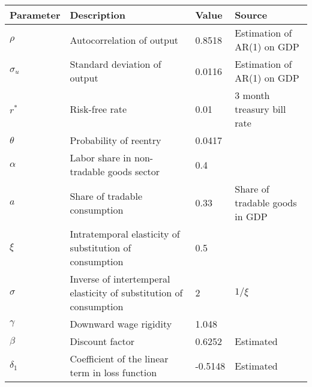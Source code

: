 \begin{table}[h]
    \centering
    \begin{tabular}{@{}llll@{}}
        \toprule
    Parameter  & Description                                                       & Value  & Source                                                                         \\ \midrule
    $\rho$     & Autocorrelation of output                                         & 0.8518 & Estimation of AR(1) on GDP\\
    $\sigma_u$ & Standard deviation of output                                      & 0.0116 & Estimation of AR(1) on GDP\\
    $r^*$      & Risk-free rate                                                    & 0.01 & 3 month treasury bill rate \\
    $\theta$   & Probability of reentry                                            & 0.0417 & \citet*{trebesch-2011-sovereign}                                              \\
    $\alpha$   & Labor share in non-tradable goods sector                          & 0.4   & \citet{Pakistan-DSGE-calibration}                                                       \\
    $a$        & Share of tradable consumption                                     & 0.33   &Share of tradable goods in GDP                    \\
    $\xi$      & Intratemporal elasticity of substitution of consumption & 0.5   & \citet{Na-18}                              \\
    $\sigma$   & Inverse of intertemperal elasticity of substitution of consumption  & 2   & $1 / \xi$                                                                      \\
    $\gamma$   & Downward wage rigidity                                            & 1.048   & \citet*{wage-rigidity-data}                  \\
    $\beta$    & Discount factor                                                   & 0.6252  &  Estimated \\
    $\delta_1$ & Coefficient of the linear term in loss function                   &  -0.5148 &   Estimated  \\

\end{tabular}
\end{table}
